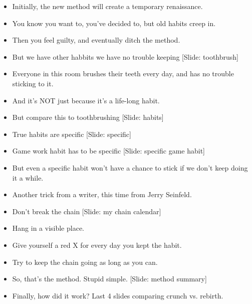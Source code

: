 \documentclass[12pt]{article}
\begin{document}
{\begin{itemize}
\item Initially, the new method will create a temporary renaissance.

\item You know you want to, you've decided to, but old habits creep in.

\item Then you feel guilty, and eventually ditch the method.

\item But we have other habbits we have no trouble keeping [Slide: toothbrush]

\item Everyone in this room brushes their teeth every day, and has no trouble sticking to it.

\item And it's NOT just because it's a life-long habit.

\item But compare this to toothbrushing [Slide: habits]

\item True habits are specific [Slide: specific]

\item Game work habit has to be specific [Slide: specific game habit]

\item But even a specific habit won't have a chance to stick if we don't keep doing it a while.


\item Another trick from a writer, this time from Jerry Seinfeld.

\item Don't break the chain [Slide: my chain calendar]

\item Hang in a visible place.

\item Give yourself a red X for every day you kept the habit.

\item Try to keep the chain going as long as you can.

\item So, that's the method.  Stupid simple.  [Slide: method summary]

\item Finally, how did it work?  Last 4 slides comparing crunch vs. rebirth.



\end{itemize}

}
\end{document}

